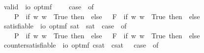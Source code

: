 \begin{isabellebody}
\begin{isamarkuptext}
\end{isamarkuptext}%
\isamarkuptrue%
\isamarkupfalse%
\ valid\ {\isacharcolon}{\isacharcolon}\ {\isachardoublequoteopen}io\ opt{\isasymRightarrow}mf{\isachardoublequoteclose}\ {\isacharparenleft}{\isachardoublequoteopen}{\isacharbrackleft}{\isacharunderscore}{\isacharbrackright}{\isachardoublequoteclose}{\isacharparenright}\ \ {\isachardoublequoteopen}{\isacharbrackleft}{\isasymphi}{\isacharbrackright}\ {\isasymequiv}\ case\ {\isasymphi}\ of\ \isanewline
\ \ \ \ P{\isacharparenleft}{\isasympsi}{\isacharparenright}\ {\isasymRightarrow}\ if\ {\isasymforall}w{\isachardot}{\isacharparenleft}{\isasympsi}\ w{\isacharparenright}\ {\isasymlongleftrightarrow}\ True\ then\ {\isasymtop}\ else\ {\isasymbottom}\ {\isacharbar}\ F{\isacharparenleft}{\isasympsi}{\isacharparenright}\ {\isasymRightarrow}\ if\ {\isasymforall}w{\isachardot}{\isacharparenleft}{\isasympsi}\ w{\isacharparenright}\ {\isasymlongleftrightarrow}\ True\ then\ {\isasymtop}\ else\ {\isasymbottom}\ {\isacharbar}\ {\isacharunderscore}\ {\isasymRightarrow}\ {\isacharasterisk}{\isachardoublequoteclose}\isanewline
{}\isamarkupfalse%
\ satisfiable\ {\isacharcolon}{\isacharcolon}\ {\isachardoublequoteopen}io\ opt{\isasymRightarrow}mf{\isachardoublequoteclose}\ {\isacharparenleft}{\isachardoublequoteopen}{\isacharbrackleft}{\isacharunderscore}{\isacharbrackright}\isactrlsup s\isactrlsup a\isactrlsup t{\isachardoublequoteclose}{\isacharparenright}\ \ {\isachardoublequoteopen}{\isacharbrackleft}{\isasymphi}{\isacharbrackright}\isactrlsup s\isactrlsup a\isactrlsup t\ {\isasymequiv}\ case\ {\isasymphi}\ of\ \isanewline
\ \ \ \ P{\isacharparenleft}{\isasympsi}{\isacharparenright}\ {\isasymRightarrow}\ if\ {\isasymexists}w{\isachardot}{\isacharparenleft}{\isasympsi}\ w{\isacharparenright}\ {\isasymlongleftrightarrow}\ True\ then\ {\isasymtop}\ else\ {\isasymbottom}\ {\isacharbar}\ F{\isacharparenleft}{\isasympsi}{\isacharparenright}\ {\isasymRightarrow}\ if\ {\isasymexists}w{\isachardot}{\isacharparenleft}{\isasympsi}\ w{\isacharparenright}\ {\isasymlongleftrightarrow}\ True\ then\ {\isasymtop}\ else\ {\isasymbottom}\ {\isacharbar}\ {\isacharunderscore}\ {\isasymRightarrow}\ {\isacharasterisk}{\isachardoublequoteclose}\isanewline
{}\isamarkupfalse%
\ countersatisfiable\ {\isacharcolon}{\isacharcolon}\ {\isachardoublequoteopen}io\ opt{\isasymRightarrow}mf{\isachardoublequoteclose}\ {\isacharparenleft}{\isachardoublequoteopen}{\isacharbrackleft}{\isacharunderscore}{\isacharbrackright}\isactrlsup c\isactrlsup s\isactrlsup a\isactrlsup t{\isachardoublequoteclose}{\isacharparenright}\ \ {\isachardoublequoteopen}{\isacharbrackleft}{\isasymphi}{\isacharbrackright}\isactrlsup c\isactrlsup s\isactrlsup a\isactrlsup t\ {\isasymequiv}\ \ case\ {\isasymphi}\ of\ \isanewline

\end{isabellebody}

